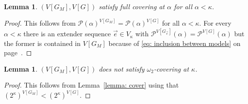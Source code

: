 \documentclass[11pt]{amsart}
\newtheorem{lemma}[theorem]{Lemma}
\theoremstyle{definition}
\theoremstyle{remark}
\def\s{\subseteq}
\begin{document}
 \begin{lemma}
      $(V[G_M],V[G])$ satisfy full covering at $\alpha$ for all $\alpha <\kappa$.
 \end{lemma}
 \begin{proof}
     This follows  from $\mathcal{P}(\alpha)^{V[G_M]}=\mathcal{P}(\alpha)^{V[G]}$ for all $\alpha <\kappa$. For every $\alpha <\kappa$ there is an extender sequence $\vec{e}\in V_\kappa$ with $\mathcal{P}^{V[G_{\vec{e}}]}(\alpha)=\mathcal{P}^{V[G]}(\alpha)$ but the former is contained in $V[G_M]$ because of \eqref{eq: inclusion between models} on page~\pageref{eq: inclusion between models}.
 \end{proof}

  \begin{lemma}\label{lemma: failure of covering}
     $(V[G_M],V[G])$ does not satisfy $\omega_2$-covering at $\kappa$.
 \end{lemma}
 \begin{proof}
 This follows from Lemma~\ref{lemma: cover} using that $(2^{\kappa})^{V[G_M]}<(2^\kappa)^{V[G]}$.

 \end{proof}
\end{document}
